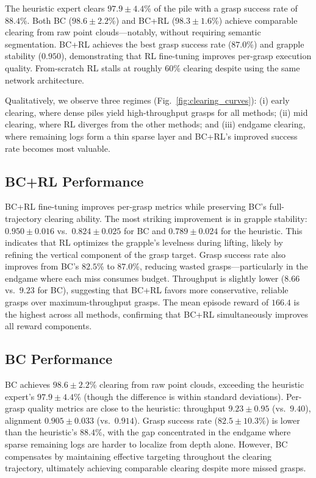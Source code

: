 \documentclass[conference]{IEEEtran}
\begin{document}
The heuristic expert clears $97.9 \pm 4.4$\% of the pile with a grasp success rate of $88.4$\%.
Both BC ($98.6 \pm 2.2$\%) and BC+RL ($98.3 \pm 1.6$\%) achieve comparable clearing from raw point clouds---notably, without requiring semantic segmentation.
BC+RL achieves the best grasp success rate ($87.0$\%) and grapple stability ($0.950$), demonstrating that RL fine-tuning improves per-grasp execution quality.
From-scratch RL stalls at roughly 60\% clearing despite using the same network architecture.

Qualitatively, we observe three regimes (Fig.~\ref{fig:clearing_curves}):
(i) early clearing, where dense piles yield high-throughput grasps for all methods;
(ii) mid clearing, where RL diverges from the other methods; and
(iii) endgame clearing, where remaining logs form a thin sparse layer and BC+RL's improved success rate becomes most valuable.

\subsection{BC+RL Performance}
\label{sec:bcrl_perf}
BC+RL fine-tuning improves per-grasp metrics while preserving BC's full-trajectory clearing ability.
The most striking improvement is in grapple stability: $0.950 \pm 0.016$ vs.\ $0.824 \pm 0.025$ for BC and $0.789 \pm 0.024$ for the heuristic.
This indicates that RL optimizes the grapple's levelness during lifting, likely by refining the vertical component of the grasp target.
Grasp success rate also improves from BC's $82.5$\% to $87.0$\%, reducing wasted grasps---particularly in the endgame where each miss consumes budget.
Throughput is slightly lower ($8.66$ vs.\ $9.23$ for BC), suggesting that BC+RL favors more conservative, reliable grasps over maximum-throughput grasps.
The mean episode reward of $166.4$ is the highest across all methods, confirming that BC+RL simultaneously improves all reward components.

\subsection{BC Performance}
\label{sec:bc_perf}
BC achieves $98.6 \pm 2.2$\% clearing from raw point clouds, exceeding the heuristic expert's $97.9 \pm 4.4$\% (though the difference is within standard deviations).
Per-grasp quality metrics are close to the heuristic: throughput $9.23 \pm 0.95$ (vs.\ $9.40$), alignment $0.905 \pm 0.033$ (vs.\ $0.914$).
Grasp success rate ($82.5 \pm 10.3$\%) is lower than the heuristic's $88.4$\%, with the gap concentrated in the endgame where sparse remaining logs are harder to localize from depth alone.
However, BC compensates by maintaining effective targeting throughout the clearing trajectory, ultimately achieving comparable clearing despite more missed grasps.
\end{document}
